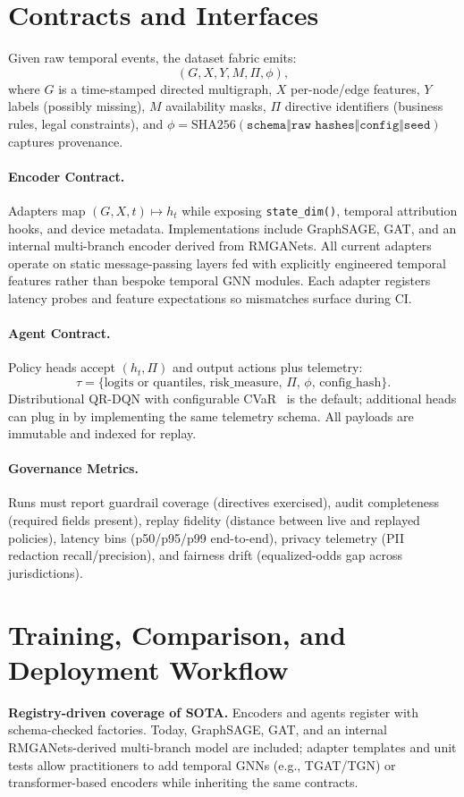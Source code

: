 \documentclass[letterpaper]{article}
\begin{document}
\section{Contracts and Interfaces}
\label{sec:contracts}
Given raw temporal events, the dataset fabric emits:
\[
(G, X, Y, M, \Pi, \phi),
\]
where $G$ is a time-stamped directed multigraph, $X$ per-node/edge features, $Y$ labels (possibly missing), $M$ availability masks, $\Pi$ directive identifiers (business rules, legal constraints), and $\phi = \mathrm{SHA256}(\texttt{schema} \Vert \texttt{raw hashes} \Vert \texttt{config} \Vert \texttt{seed})$ captures provenance.

\paragraph{Encoder Contract.} Adapters map $(G,X,t)\mapsto h_t$ while exposing \texttt{state\_dim()}, temporal attribution hooks, and device metadata. Implementations include GraphSAGE, GAT, and an internal multi-branch encoder derived from RMGANets. All current adapters operate on static message-passing layers fed with explicitly engineered temporal features rather than bespoke temporal GNN modules. Each adapter registers latency probes and feature expectations so mismatches surface during CI.

\paragraph{Agent Contract.} Policy heads accept $(h_t,\Pi)$ and output actions plus telemetry:
\[
\tau = \{\text{logits or quantiles},\, \text{risk\_measure},\, \Pi,\, \phi,\, \text{config\_hash}\}.
\]
Distributional QR-DQN with configurable CVaR~\citep{dabney2018distributional,chow2015risk} is the default; additional heads can plug in by implementing the same telemetry schema. All payloads are immutable and indexed for replay.

\paragraph{Governance Metrics.} Runs must report guardrail coverage (directives exercised), audit completeness (required fields present), replay fidelity (distance between live and replayed policies), latency bins (p50/p95/p99 end-to-end), privacy telemetry (PII redaction recall/precision), and fairness drift (equalized-odds gap across jurisdictions).

\section{Training, Comparison, and Deployment Workflow}
\label{sec:workflow}
\textbf{Registry-driven coverage of SOTA.}
Encoders and agents register with schema-checked factories. Today, GraphSAGE, GAT, and an internal RMGANets-derived multi-branch model are included; adapter templates and unit tests allow practitioners to add temporal GNNs (e.g., TGAT/TGN) or transformer-based encoders while inheriting the same contracts.
\end{document}
